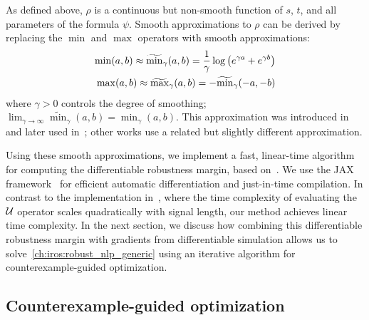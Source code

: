 As defined above, $\rho$ is a continuous but non-smooth function of $s$, $t$, and all parameters of the formula $\psi$. Smooth approximations to $\rho$ can be derived by replacing the $\min$ and $\max$ operators with smooth approximations:
\begin{align}
	\min(a, b) \approx \widetilde{\min}_\gamma(a, b) = \frac{1}{\gamma} \log\left( e^{\gamma a} + e^{\gamma b} \right) \label{ch:iros:smooth_min} \\
	\max(a, b) \approx \widetilde{\max}_\gamma(a, b) = -\widetilde{\min}_{\gamma}(-a, -b) \label{ch:iros:smooth_max}
\end{align}
where $\gamma > 0$ controls the degree of smoothing; $\lim_{\gamma \to \infty} \widetilde{\min}_\gamma(a, b) = \min_\gamma(a, b)$. This approximation was introduced in~\cite{pantSmoothOperatorControl2017} and later used in~\cite{pantFlybyLogicControlMultiDrone2018,pantazidesSatelliteMissionPlanning2022}; other works \cite{leungBackPropagationSignalTemporal2021} use a related but slightly different approximation.

Using these smooth approximations, we implement a fast, linear-time algorithm for computing the differentiable robustness margin, based on~\cite{donzeEfficientRobustMonitoring2013a}. We use the JAX framework~\cite{jax2018github} for efficient automatic differentiation and just-in-time compilation. In contrast to the implementation in~\cite{leungBackPropagationSignalTemporal2021}, where the time complexity of evaluating the $\mathcal{U}$ operator scales quadratically with signal length, our method achieves linear time complexity. In the next section, we discuss how combining this differentiable robustness margin with gradients from differentiable simulation allows us to solve~\eqref{ch:iros:robust_nlp_generic} using an iterative algorithm for counterexample-guided optimization.

\subsection{Counterexample-guided optimization}\label{ch:iros:cego}

